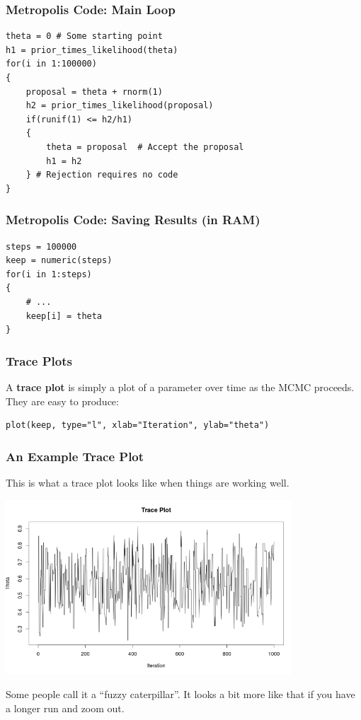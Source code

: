 \documentclass{beamer}
\begin{document}
\begin{frame}[fragile]
\frametitle{Metropolis Code: Main Loop}

\small
\begin{verbatim}
theta = 0 # Some starting point
h1 = prior_times_likelihood(theta)
for(i in 1:100000)
{
    proposal = theta + rnorm(1)
    h2 = prior_times_likelihood(proposal)
    if(runif(1) <= h2/h1)
    {
        theta = proposal  # Accept the proposal
        h1 = h2
    } # Rejection requires no code
}
\end{verbatim}

\end{frame}

\begin{frame}[fragile]
\frametitle{Metropolis Code: Saving Results (in RAM)}
\begin{verbatim}
steps = 100000
keep = numeric(steps)
for(i in 1:steps)
{
    # ...
    keep[i] = theta
}
\end{verbatim}
\end{frame}


\begin{frame}[fragile]
\frametitle{Trace Plots}
A {\bf trace plot} is simply a plot of a parameter over time as the MCMC
proceeds. They are easy to produce:
\begin{verbatim}
plot(keep, type="l", xlab="Iteration", ylab="theta")
\end{verbatim}

\end{frame}

\begin{frame}[fragile]
\frametitle{An Example Trace Plot}
This is what a trace plot looks like when things are working well.

\begin{center}
\includegraphics[width=0.8\textwidth]{images/trace_plot.png}
\end{center}

Some people call it a ``fuzzy caterpillar''. It looks a bit more like that
if you have a longer run and zoom out.

\end{frame}
\end{document}
